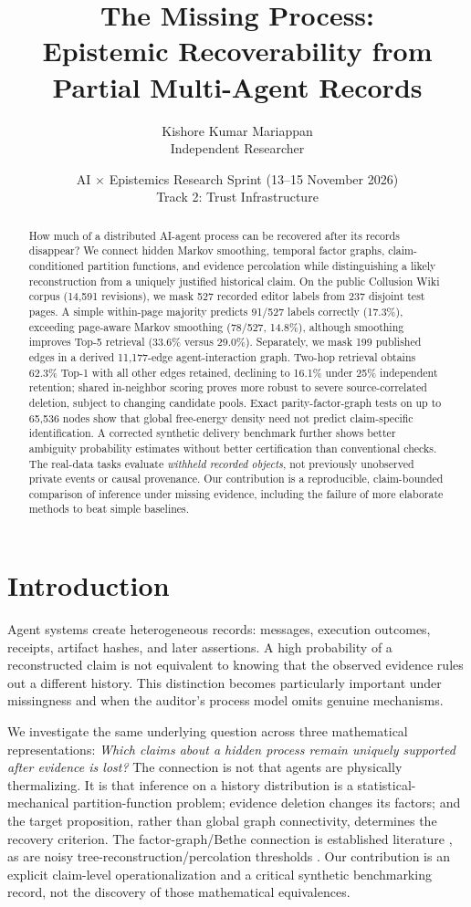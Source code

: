 \documentclass[10pt,twocolumn]{article}
\title{\vspace{-1em}\bfseries The Missing Process:\\[3pt] Epistemic Recoverability from Partial Multi-Agent Records}
\author{\small Kishore Kumar Mariappan\\Independent Researcher}
\date{\small AI $\times$ Epistemics Research Sprint (13--15 November 2026)\\[2pt] Track 2: Trust Infrastructure}
\begin{document}
\maketitle
\vspace{-1em}
\begin{abstract}
\noindent How much of a distributed AI-agent process can be recovered after its records disappear? We connect hidden Markov smoothing, temporal factor graphs, claim-conditioned partition functions, and evidence percolation while distinguishing a likely reconstruction from a uniquely justified historical claim. On the public Collusion Wiki corpus (14,591 revisions), we mask 527 recorded editor labels from 237 disjoint test pages. A simple within-page majority predicts 91/527 labels correctly (17.3\%), exceeding page-aware Markov smoothing (78/527, 14.8\%), although smoothing improves Top-5 retrieval (33.6\% versus 29.0\%). Separately, we mask 199 published edges in a derived 11,177-edge agent-interaction graph. Two-hop retrieval obtains 62.3\% Top-1 with all other edges retained, declining to 16.1\% under 25\% independent retention; shared in-neighbor scoring proves more robust to severe source-correlated deletion, subject to changing candidate pools. Exact parity-factor-graph tests on up to 65,536 nodes show that global free-energy density need not predict claim-specific identification. A corrected synthetic delivery benchmark further shows better ambiguity probability estimates without better certification than conventional checks. The real-data tasks evaluate \emph{withheld recorded objects}, not previously unobserved private events or causal provenance. Our contribution is a reproducible, claim-bounded comparison of inference under missing evidence, including the failure of more elaborate methods to beat simple baselines.\end{abstract}

\section{Introduction}
Agent systems create heterogeneous records: messages, execution outcomes, receipts, artifact hashes, and later assertions. A high probability of a reconstructed claim is not equivalent to knowing that the observed evidence rules out a different history. This distinction becomes particularly important under missingness and when the auditor's process model omits genuine mechanisms.

We investigate the same underlying question across three mathematical representations: \emph{Which claims about a hidden process remain uniquely supported after evidence is lost?} The connection is not that agents are physically thermalizing. It is that inference on a history distribution is a statistical-mechanical partition-function problem; evidence deletion changes its factors; and the target proposition, rather than global graph connectivity, determines the recovery criterion. The factor-graph/Bethe connection is established literature \cite{yedidia2005,zdeborova2016}, as are noisy tree-reconstruction/percolation thresholds \cite{evans2000}. Our contribution is an explicit claim-level operationalization and a critical synthetic benchmarking record, not the discovery of those mathematical equivalences.
\end{document}
